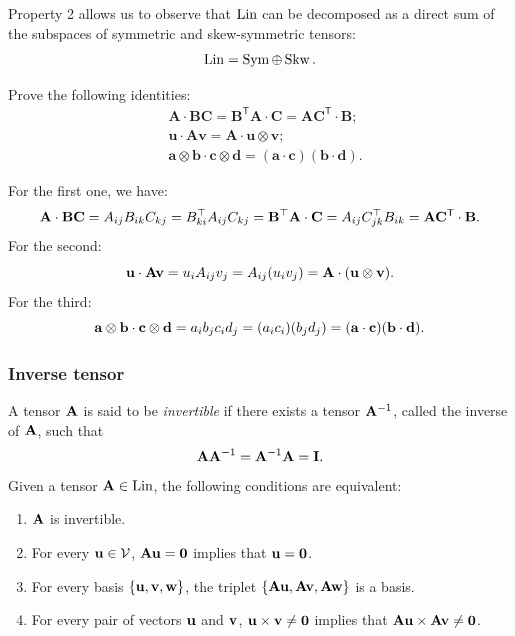 Property 2 allows us to observe that $\operatorname{Lin}$ can be decomposed as a direct sum of the subspaces of symmetric and skew-symmetric tensors:
\begin{equation}
	\operatorname{Lin} = \operatorname{Sym} \oplus \operatorname{Skw}. 
\end{equation}

\begin{exercise}
	Prove the following identities:
	\begin{equation}
		\begin{aligned}
			&\mathbf{A}\cdot\mathbf{B}\mathbf{C}=\mathbf{B}^\mathsf{T}\mathbf{A}\cdot\mathbf{C}=\mathbf{A}\mathbf{C}^\mathsf{T}\cdot\mathbf{B}; \\
			&\mathbf{u}\cdot\mathbf{A}\mathbf{v}=\mathbf{A}\cdot\mathbf{u}\otimes\mathbf{v}; \\
			&\mathbf{a\otimes b\cdot c\otimes d=(a\cdot c)(b\cdot d).}
		\end{aligned}
	\end{equation}
	\begin{svolgimento}
		For the first one, we have:
		\begin{equation}
			\mathbf{A}\cdot\mathbf{B}\mathbf{C}=A_{ij}B_{ik}C_{kj}=B^\top_{ki}A_{ij}C_{kj}=\mathbf{B} ^\top \mathbf{A} \cdot \mathbf{C} =A_{ij}C^\top_{jk}B_{ik}=\mathbf{A}\mathbf{C}^\mathsf{T}\cdot\mathbf{B}.
		\end{equation}
		For the second:
		\begin{equation}
			\mathbf{u}\cdot\mathbf{A}\mathbf{v}=u_i A_{ij}v_j=A_{ij}(u_iv_j)=\mathbf{A} \cdot(\mathbf{u} \otimes \mathbf{v}).
		\end{equation}
		For the third:
		\begin{equation}
			\mathbf{a\otimes b\cdot c\otimes d}=a_i b_j c_i d_j=(a_i c_i)(b_j d_j)=(\mathbf{a}\cdot \mathbf{c})(\mathbf{b}\cdot \mathbf{d}).
		\end{equation}
	\end{svolgimento}
\end{exercise}

\subsubsection{Inverse tensor}
A tensor $\mathbf{A}$ is said to be \textit{invertible} if there exists a tensor $\mathbf{A} ^{-1}$, called the inverse of $\mathbf{A}$, such that
\begin{equation}
	\mathbf{A} \mathbf{A} ^{-1}=\mathbf{A} ^{-1}\mathbf{A} =\mathbf{I}.
\end{equation} 
Given a tensor $\mathbf{A} \in \operatorname{Lin}$, the following conditions are equivalent:
\begin{enumerate}
	\item $\mathbf{A}$ is invertible.
	\item For every $\mathbf{u} \in \mathcal{V}$, $\mathbf{A} \mathbf{u}=\mathbf{0} $ implies that $\mathbf{u} = \mathbf{0}$.
	\item For every basis $\{ \mathbf{u}, \mathbf{v}, \mathbf{w} \}$, the triplet $\{\mathbf{A} \mathbf{u}, \mathbf{A} \mathbf{v}, \mathbf{A} \mathbf{w}\}$ is a basis.
	\item For every pair of vectors $\mathbf{u}$ and $\mathbf{v}$, $\mathbf{u} \times \mathbf{v} \neq \mathbf{0}$ implies that $\mathbf{A}\mathbf{u} \times \mathbf{A}\mathbf{v}\neq \mathbf{0}$.
\end{enumerate}

